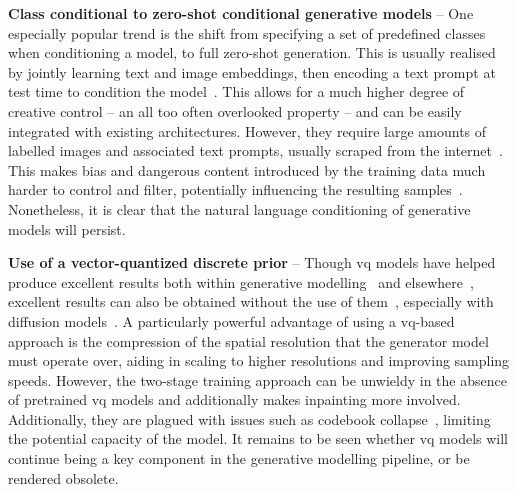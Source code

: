 \textbf{Class conditional to zero-shot conditional generative models} -- 
One especially popular trend is the shift from specifying a set of predefined
classes when conditioning a model, to full zero-shot generation. This is usually
realised by jointly learning text and image embeddings, then encoding a text
prompt at test time to condition the
model~\cite{ramesh2021dalle,ramesh2022dalle2,rombach2021highresolution,lee2022rqvae}.
This allows for a much higher degree of creative control -- an all too often
overlooked property -- and can be easily integrated with existing architectures.
However, they require large amounts of labelled images and associated text
prompts, usually scraped from the
internet~\cite{rombach2021highresolution,ramesh2021dalle,ramesh2022dalle2}. This
makes bias and dangerous content introduced by the training data much harder to
control and filter, potentially influencing the resulting
samples~\cite{mishkin2022risks}. Nonetheless, it is clear that the natural
language conditioning of generative models will persist.

\textbf{Use of a vector-quantized discrete prior} -- 
Though \gls{vq} models have helped produce excellent results both within
generative
modelling~\cite{razavi2019generating,esser2021taming,bondtaylor2021unleashing,rombach2021highresolution,ramesh2021dalle,yu2021vqgan,lee2022rqvae}
and elsewhere~\cite{zeghidour2021soundstream}, excellent results can also be
obtained without the use of
them~\cite{child2020vqvae,arash2020nvae,hazami2022efficient}, especially with
diffusion
models~\cite{song2019sbm,song2020sde,dhariwal2021ddpm,song2021mlt,xiao2021trilemma,vahdat2021sbmlatent,martineau2021fast,dockhorn2021langevin}.
A particularly powerful advantage of using a \gls{vq}-based approach is the
compression of the spatial resolution that the generator model must operate
over, aiding in scaling to higher resolutions and improving sampling speeds.
However, the two-stage training approach can be unwieldy in the absence of
pretrained \gls{vq} models and additionally makes inpainting more involved.
Additionally, they are plagued with issues such as codebook
collapse~\cite{esser2021taming,bondtaylor2021unleashing,yu2021vqgan}, limiting
the potential capacity of the model. It remains to be seen whether \gls{vq}
models will continue being a key component in the generative modelling pipeline,
or be rendered obsolete.

